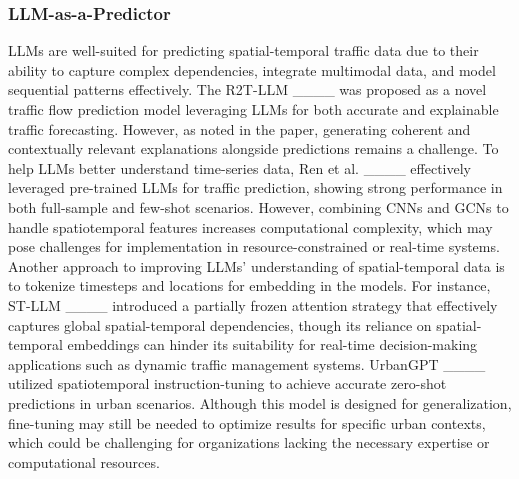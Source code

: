 \subsubsection{LLM-as-a-Predictor}
LLMs are well-suited for predicting spatial-temporal traffic data due to their ability to capture complex dependencies, integrate multimodal data, and model sequential patterns effectively. The R2T-LLM ____ was proposed as a novel traffic flow prediction model leveraging LLMs for both accurate and explainable traffic forecasting. However, as noted in the paper, generating coherent and contextually relevant explanations alongside predictions remains a challenge. To help LLMs better understand time-series data, Ren et al. ____ effectively leveraged pre-trained LLMs for traffic prediction, showing strong performance in both full-sample and few-shot scenarios. However, combining CNNs and GCNs to handle spatiotemporal features increases computational complexity, which may pose challenges for implementation in resource-constrained or real-time systems. Another approach to improving LLMs’ understanding of spatial-temporal data is to tokenize timesteps and locations for embedding in the models. For instance, ST-LLM ____ introduced a partially frozen attention strategy that effectively captures global spatial-temporal dependencies, though its reliance on spatial-temporal embeddings can hinder its suitability for real-time decision-making applications such as dynamic traffic management systems. UrbanGPT ____ utilized spatiotemporal instruction-tuning to achieve accurate zero-shot predictions in urban scenarios. Although this model is designed for generalization, fine-tuning may still be needed to optimize results for specific urban contexts, which could be challenging for organizations lacking the necessary expertise or computational resources.

